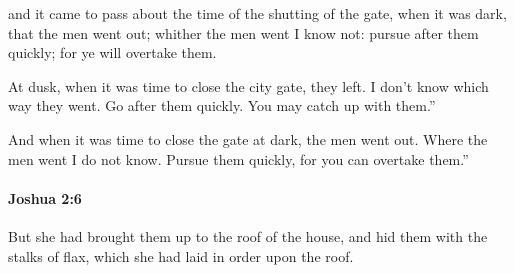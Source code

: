			\begin{versebox}
					\item[BHS] 
					\item[ASV] and it came to pass about the time of the shutting of the gate, when it was dark, that the men went out; whither the men went I know not: pursue after them quickly; for ye will overtake them.
					\item[NIV] At dusk, when it was time to close the city gate, they left. I don’t know which way they went. Go after them quickly. You may catch up with them.”
					\item[NRSV] And when it was time to close the gate at dark, the men went out. Where the men went I do not know. Pursue them quickly, for you can overtake them.”
			\end{versebox}

		\paragraph{Joshua 2:6} %
			\label{JOSHUA-2-6}

			But she had brought them up to the roof of the house, and hid them with the stalks of flax, which she had laid in order upon the roof.

